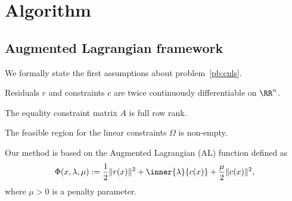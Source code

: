 \section{Algorithm}\label{sec:algorithm}

\subsection{Augmented Lagrangian framework}\label{subsec:al_framework}

We formally state the first assumptions about problem~\eqref{pb:cnls}.
\begin{assumption}\label{assumption:functions_C2}
	Residuals $r$ and constraints $c$ are twice continuously differentiable on $\RR^n$.
\end{assumption}
\begin{assumption}\label{assumption:full_rank_A}
	The equality constraint matrix $A$ is full row rank.
\end{assumption}
\begin{assumption}\label{assumption:feasible_linear_cons}
	The feasible region for the linear constraints $\Omega$ is non-empty.
\end{assumption}

Our method is based on the Augmented Lagrangian (AL) function defined as
\begin{equation}\label{eq:al}
	\Phi(x,\lambda,\mu) := \dfrac{1}{2}\|r(x)\|^2 + \inner{\lambda}{c(x)} + \dfrac{\mu}{2} \|c(x)\|^2,
\end{equation}
where $\mu > 0$ is a penalty parameter.

